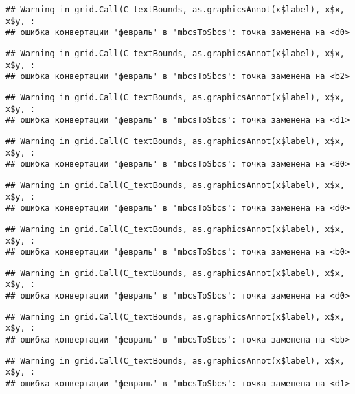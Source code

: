 \documentclass[
]{article}
\begin{document}
\begin{verbatim}
## Warning in grid.Call(C_textBounds, as.graphicsAnnot(x$label), x$x, x$y, :
## ошибка конвертации 'февраль' в 'mbcsToSbcs': точка заменена на <d0>
\end{verbatim}

\begin{verbatim}
## Warning in grid.Call(C_textBounds, as.graphicsAnnot(x$label), x$x, x$y, :
## ошибка конвертации 'февраль' в 'mbcsToSbcs': точка заменена на <b2>
\end{verbatim}

\begin{verbatim}
## Warning in grid.Call(C_textBounds, as.graphicsAnnot(x$label), x$x, x$y, :
## ошибка конвертации 'февраль' в 'mbcsToSbcs': точка заменена на <d1>
\end{verbatim}

\begin{verbatim}
## Warning in grid.Call(C_textBounds, as.graphicsAnnot(x$label), x$x, x$y, :
## ошибка конвертации 'февраль' в 'mbcsToSbcs': точка заменена на <80>
\end{verbatim}

\begin{verbatim}
## Warning in grid.Call(C_textBounds, as.graphicsAnnot(x$label), x$x, x$y, :
## ошибка конвертации 'февраль' в 'mbcsToSbcs': точка заменена на <d0>
\end{verbatim}

\begin{verbatim}
## Warning in grid.Call(C_textBounds, as.graphicsAnnot(x$label), x$x, x$y, :
## ошибка конвертации 'февраль' в 'mbcsToSbcs': точка заменена на <b0>
\end{verbatim}

\begin{verbatim}
## Warning in grid.Call(C_textBounds, as.graphicsAnnot(x$label), x$x, x$y, :
## ошибка конвертации 'февраль' в 'mbcsToSbcs': точка заменена на <d0>
\end{verbatim}

\begin{verbatim}
## Warning in grid.Call(C_textBounds, as.graphicsAnnot(x$label), x$x, x$y, :
## ошибка конвертации 'февраль' в 'mbcsToSbcs': точка заменена на <bb>
\end{verbatim}

\begin{verbatim}
## Warning in grid.Call(C_textBounds, as.graphicsAnnot(x$label), x$x, x$y, :
## ошибка конвертации 'февраль' в 'mbcsToSbcs': точка заменена на <d1>
\end{verbatim}
\end{document}
